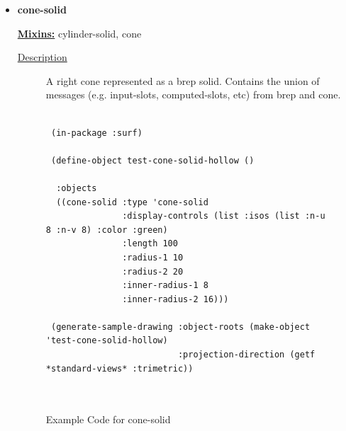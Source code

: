 \documentclass [11pt]{book}
\begin{document}
\begin{itemize}
\begin{description}
\end{description}







\item {}
\label{prim:cone-solid}
\textbf{cone-solid}


\textbf{
\underline{Mixins:}} cylinder-solid, cone





\begin{description}

\item [
\underline{Description}]


A right cone represented as a brep solid. Contains the union of messages (e.g. input-slots, computed-slots, etc)
from brep and cone.



\end{description}




\begin{figure}
\begin{lrbox}{\boxedverb}
\begin{minipage}{\linewidth}
{\small

\begin{verbatim}
                  
 (in-package :surf)

 (define-object test-cone-solid-hollow ()
  
  :objects
  ((cone-solid :type 'cone-solid
               :display-controls (list :isos (list :n-u 8 :n-v 8) :color :green)
               :length 100 
               :radius-1 10 
               :radius-2 20
               :inner-radius-1 8 
               :inner-radius-2 16)))
 
 (generate-sample-drawing :object-roots (make-object 'test-cone-solid-hollow)
                          :projection-direction (getf *standard-views* :trimetric))
 
 
\end{verbatim}}
\end{minipage}
\end{lrbox}
\fbox{\usebox{\boxedverb}}

\caption{Example Code for cone-solid}

\label{fig:example-code-cone-solid}

\end{figure}


\end{itemize}
\end{document}
